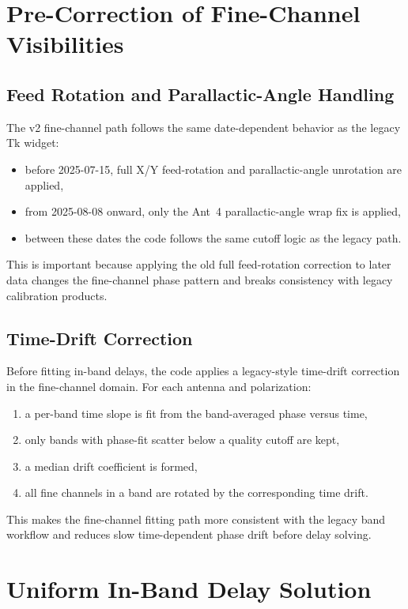 \documentclass[11pt]{article}
\begin{document}
\section{Pre-Correction of Fine-Channel Visibilities}

\subsection{Feed Rotation and Parallactic-Angle Handling}

The v2 fine-channel path follows the same date-dependent behavior as the legacy
Tk widget:
\begin{itemize}[leftmargin=1.5em]
  \item before 2025-07-15, full X/Y feed-rotation and parallactic-angle
  unrotation are applied,
  \item from 2025-08-08 onward, only the Ant~4 parallactic-angle wrap fix is
  applied,
  \item between these dates the code follows the same cutoff logic as the
  legacy path.
\end{itemize}

This is important because applying the old full feed-rotation correction to
later data changes the fine-channel phase pattern and breaks consistency with
legacy calibration products.

\subsection{Time-Drift Correction}

Before fitting in-band delays, the code applies a legacy-style time-drift
correction in the fine-channel domain. For each antenna and polarization:
\begin{enumerate}[leftmargin=1.5em]
  \item a per-band time slope is fit from the band-averaged phase versus time,
  \item only bands with phase-fit scatter below a quality cutoff are kept,
  \item a median drift coefficient is formed,
  \item all fine channels in a band are rotated by the corresponding time drift.
\end{enumerate}

This makes the fine-channel fitting path more consistent with the legacy band
workflow and reduces slow time-dependent phase drift before delay solving.

\section{Uniform In-Band Delay Solution}
\end{document}
